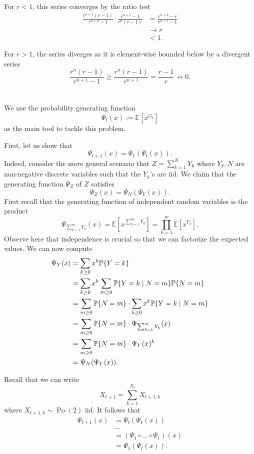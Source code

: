 \documentclass[10pt]{article}
\DeclarePairedDelimiter{\set}{\lbrace}{\rbrace}
\DeclareMathOperator{\Po}{Po}
\newcommand{\E}{\mathbb{E}}
\renewcommand{\P}{\mathbb{P}}
\begin{document}
For $r < 1$,
this series converges by the ratio test
\begin{align*}
  \frac{r^{n+1}(r-1)}{r^{n+2}-1}\cdot \frac{r^{n+1}-1}{r^n (r-1)}
  &= \frac{r^{n+2} - r}{r^{n+1}-1} \\
  &\to r \\
  &< 1.
\end{align*}

For $r > 1$,
the series diverges as it is element-wise bounded below by a divergent series
\[
  \frac{r^n (r-1)}{r^{n+1} - 1}
  \geq \frac{r^n (r-1)}{r^{n+1}}
  = \frac{r-1}{r}
  \not\to 0.
\]

\clearpage
\section{}
We use the probability generating function
\[
  \Psi_t(x)
  := \E\left[ x^{G_t} \right]
\]
as the main tool to tackle this problem.

First,
let us show that
\[
  \Psi_{t+1}(x) = \Psi_1(\Psi_t(x)).
\]
Indeed,
consider the more general scenario that $Z = \sum_{k=1}^N Y_k$
where $Y_k, N$ are non-negative discrete variables
such that the $Y_k$'s are iid.
We claim that the generating function $\Psi_Z$ of $Z$ satisfies
\[
  \Psi_Z(x) = \Psi_N(\Psi_Y(x)).
\]
First recall that the generating function of independent random variables is the product
\[
  \Psi_{\sum_{k=1}^m Y_k}(x)
  = \E\left[ x^{\sum_{k=1}^m Y_k} \right]
  = \prod_{k=1}^m \E\left[ x^{Y_k} \right].
\]
Observe here that independence is crucial so that we can factorize the expected values.
We can now compute
\begin{align*}
  \Psi_Y(x)
  &= \sum_{k\geq 0} x^k \P\set{Y = k} \\
  &= \sum_{k\geq 0} x^k \sum_{m\geq 0} \P\set{Y = k\mid N=m}\P\set{N=m} \\
  &= \sum_{m\geq 0} \P\set{N=m}\cdot \sum_{k\geq 0} x^k \P\set{Y = k\mid N=m} \\
  &= \sum_{m\geq 0} \P\set{N=m}\cdot \Psi_{\sum_{k=1}^m Y_k}(x) \\
  &= \sum_{m\geq 0} \P\set{N=m}\cdot \Psi_Y(x)^k \\
  &= \Psi_N(\Psi_Y(x)).
\end{align*}

Recall that we can write
\[
  X_{t+1} = \sum_{k=1}^{X_t} X_{t+1, k}
\]
where $X_{t+1, k}\sim \Po(2)$ iid.
It follows that
\begin{align*}
  \Psi_{t+1}(x)
  &= \Psi_t(\Psi_1(x)) \\
  &\dots \\
  &= (\Psi_1\circ \dots\circ \Psi_1) (x) \\
  &= \Psi_1(\Psi_t(x)).
\end{align*}
\end{document}
